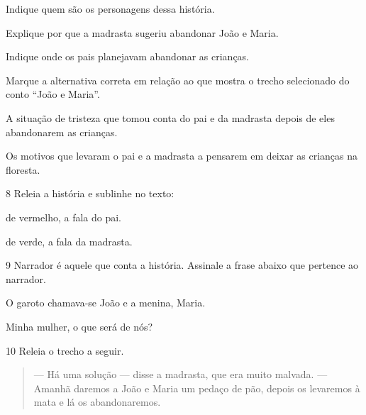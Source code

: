 \begin{escolha}
\item Indique quem são os personagens dessa história.


\item Explique por que a madrasta sugeriu abandonar João e Maria.


\item Indique onde os pais planejavam abandonar as crianças.


\item Marque a alternativa correta em relação ao que mostra o trecho
selecionado do conto ``João e Maria''.

\begin{boxlist}
 A situação de tristeza que tomou conta do pai e da madrasta depois
de eles abandonarem as crianças.

 Os motivos que levaram o pai e a madrasta a pensarem em deixar as
crianças na floresta.
\end{boxlist}
\end{escolha}

\num{8} Releia a história e sublinhe no texto:

\begin{escolha}
\item de vermelho, a fala do pai.

\item de verde, a fala da madrasta.
\end{escolha}

\num{9} Narrador é aquele que conta a história. Assinale a frase abaixo que
pertence ao narrador.

\begin{escolha}
 O garoto chamava-se João e a menina, Maria.

 Minha mulher, o que será de nós?
\end{escolha}

\num{10} Releia o trecho a seguir.

\begin{quote}
--- Há uma solução --- disse a madrasta, que era muito malvada.
--- Amanhã daremos a João e Maria um pedaço de pão, depois os levaremos
à mata e lá os abandonaremos.
\end{quote}

